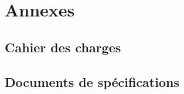 \appendix
\chapter{Annexes}
\section{Cahier des charges}\label{sec:cac}

\section{Documents de spécifications}\label{sec:spe}

